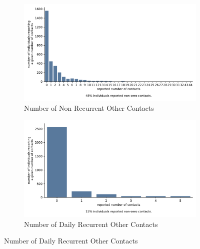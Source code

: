\begin{figure}
    \centering

    \begin{subfigure}[b]{0.25\textwidth}
        \centering

        \includegraphics[width=\textwidth]{../figures/results/figures/data/distributions_of_the_number_of_contacts/other_non_recurrent}
        \caption{Number of Non Recurrent Other Contacts}
        \label{n_contacts_other_non_recurrent}
    \end{subfigure}

    \hfill

    \begin{subfigure}[b]{0.25\textwidth}
        \centering
        \includegraphics[width=\textwidth]{../figures/results/figures/data/distributions_of_the_number_of_contacts/other_recurrent_daily}
        \caption{Number of Daily Recurrent Other Contacts}
        \label{n_contacts_other_daily_recurrent}
    \end{subfigure}

    \hfill


\end{figure}
